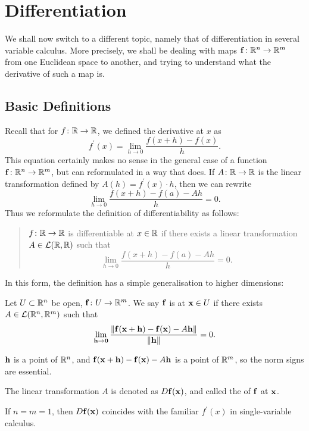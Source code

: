 \chapter{Differentiation}\label{chap:multivariable-differentiation}
We shall now switch to a different topic, namely that of differentiation in several variable calculus. More precisely, we shall be dealing with maps $\vb{f}\colon \mathbb R^n\to\mathbb R^m$ from one Euclidean space to another, and trying to understand what the derivative of such a map is.

\section{Basic Definitions}
Recall that for $f\colon\mathbb R\to\mathbb R$, we defined the derivative at $x$ as
\[f^\prime(x)=\lim_{h\to0}\frac{f(x+h)-f(x)}{h}.\]
This equation certainly makes no sense in the general case of a function $\vb{f}\colon\mathbb R^n\to\mathbb R^m$, but can reformulated in a way that does.
If $A\colon\mathbb R\to\mathbb R$ is the linear transformation defined by $A(h)=f^\prime(x)\cdot h$, then we can rewrite
\[\lim_{h\to0}\frac{f(x+h)-f(a)-Ah}{h}=0.\]
Thus we reformulate the definition of differentiability as follows:
\begin{quote}
$f\colon\mathbb R\to\mathbb R$ is differentiable at $x\in\mathbb R$ if there exists a linear transformation $A\in\mathcal{L}(\mathbb R,\mathbb R)$ such that
\[\lim_{h\to0}\frac{f(x+h)-f(a)-Ah}{h}=0.\]
\end{quote}

In this form, the definition has a simple generalisation to higher dimensions:

\begin{definition}[Differentiability]
Let $U\subset\mathbb R^n$ be open, $\vb{f}\colon U\to\mathbb R^m$. We say $\vb{f}$ is  at $\vb{x}\in U$ if there exists $A\in\mathcal{L}(\mathbb R^n,\mathbb R^m)$ such that
\[\lim_{\vb{h}\to\vb{0}}\frac{\norm{\vb{f}(\vb{x}+\vb{h})-\vb{f}(\vb{x})-A\vb{h}}}{\norm{\vb{h}}}=0.\]
\end{definition}

\begin{remark}
$\vb{h}$ is a point of $\mathbb R^n$, and $\vb{f}(\vb{x}+\vb{h})-\vb{f}(\vb{x})-A\vb{h}$ is a point of $\mathbb R^m$, so the norm signs are essential.
\end{remark}

The linear transformation $A$ is denoted as $D\vb{f}(\vb{x})$, and called the  of $\vb{f}$ at $\vb{x}$.

\begin{remark}
If $n=m=1$, then $D\vb{f}(\vb{x})$ coincides with the familiar $f^\prime(x)$ in single-variable calculus.
\end{remark}

